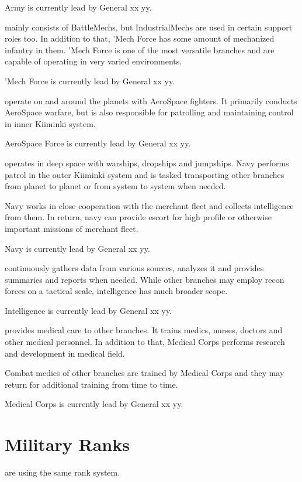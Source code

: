 \documentclass{tufte-book}
\begin{document}
Army is currently lead by General xx yy.

 mainly consists of BattleMechs, but IndustrialMechs
are used in certain support roles too. In addition to that, 'Mech Force has
some amount of mechanized infantry in them. 'Mech Force is one of the most
versatile branches and are capable of operating in very varied environments.

'Mech Force is currently lead by General xx yy.

 operate on and around the planets with AeroSpace
fighters. It primarily conducts AeroSpace warfare, but is also responsible for
patrolling and maintaining control in inner Kiiminki system.

AeroSpace Force is currently lead by General xx yy.

 operates in deep space with warships, dropships and
jumpships. Navy performs patrol in the outer Kiiminki system and is tasked
transporting other branches from planet to planet or from system to system
when needed.

Navy works in close cooperation with the merchant fleet and collects
intelligence from them. In return, navy can provide escort for high profile
or otherwise important missions of merchant fleet.

Navy is currently lead by General xx yy.

 continuously gathers data from various sources,
analyzes it and provides summaries and reports when needed. While other
branches may employ recon forces on a tactical scale, intelligence has much
broader scope.

Intelligence is currently lead by General xx yy.

 provides medical care to other branches. It trains
medics, nurses, doctors and other medical personnel. In addition to that,
Medical Corps performs research and development in medical field.

Combat medics of other branches are trained by Medical Corps and they may
return for additional training from time to time.

Medical Corps is currently lead by General xx yy.

\section{Military Ranks}
\label{sc:military_ranks}

 are using the same rank system.
\end{document}
